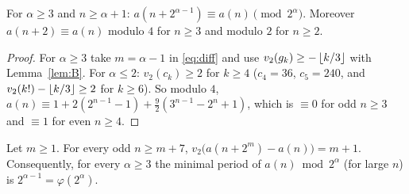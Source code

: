 \documentclass[11pt]{amsart}
\begin{document}
\begin{proposition}\label{prop:two}
For $\alpha\ge3$ and $n\ge\alpha+1$: $a(n+2^{\alpha-1})\equiv a(n)\pmod{2^\alpha}$. Moreover $a(n+2)\equiv a(n)$ modulo $4$ for $n\ge3$ and modulo $2$ for $n\ge2$.
\end{proposition}
\begin{proof}
For $\alpha\ge3$ take $m=\alpha-1$ in \eqref{eq:diff} and use $v_2(g_k)\ge-\left\lfloor k/3\right\rfloor$ with Lemma~\ref{lem:B}. For $\alpha\le2$: $v_2(c_k)\ge2$ for $k\ge4$ ($c_4=36$, $c_5=240$, and $v_2(k!)-\left\lfloor k/3\right\rfloor\ge2$ for $k\ge6$). So modulo $4$, $a(n)\equiv1+2(2^{n-1}-1)+\frac92(3^{n-1}-2^n+1)$, which is $\equiv0$ for odd $n\ge3$ and $\equiv1$ for even $n\ge4$.
\end{proof}

\begin{proposition}\label{prop:minimal}
Let $m\ge1$. For every odd $n\ge m+7$, $v_2\bigl(a(n+2^m)-a(n)\bigr)=m+1$. Consequently, for every $\alpha\ge3$ the minimal period of $a(n)\bmod2^\alpha$ (for large $n$) is $2^{\alpha-1}=\varphi(2^\alpha)$.
\end{proposition}
\end{document}
